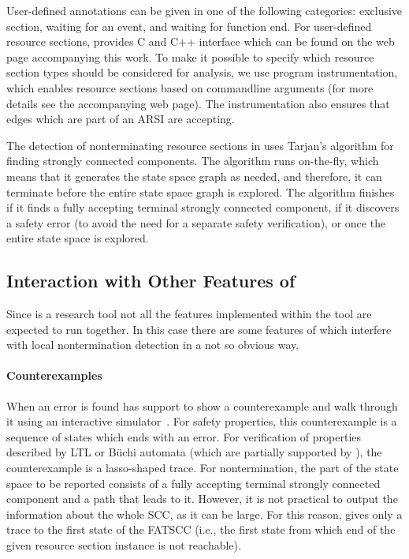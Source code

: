User-defined annotations can be given in one of the following categories: exclusive section,
 waiting for an event, and
 waiting for function end.
For user-defined resource sections, \divine provides C and C++ interface which can be found on the web page accompanying this work.
To make it possible to specify which resource section types should be considered
for analysis, we use program instrumentation, which enables resource sections
based on commandline arguments (for more details see the accompanying web page).
The instrumentation also ensures that edges which are part of an ARSI are accepting.

The detection of nonterminating resource sections in \divine uses Tarjan's algorithm for finding strongly connected components.
The algorithm runs on-the-fly, which means that it generates the state space
graph as needed, and therefore, it can terminate before the entire state space graph is explored.
The algorithm finishes if it finds a fully accepting terminal strongly connected
component, if it discovers a safety error (to avoid the need for a separate
safety verification), or once the entire state space is explored.


\subsection{Interaction with Other Features of \divine}

Since \divine is a research tool not all the features implemented within the
tool are expected to run together. In this case there are some
features of \divine which interfere with local nontermination detection
in a not so obvious way.


\paragraph{Counterexamples}
%
When an error is found \divine has support to show a counterexample and walk through it using an interactive simulator~.
For safety properties, this counterexample is a sequence of states which ends with an error.
For verification of properties described by LTL or Büchi automata (which are partially supported by \divine), the counterexample is a lasso-shaped trace.
For nontermination, the  part of the state space to be reported consists of a fully
accepting terminal strongly connected component and a path that leads to it.
However, it is not practical to output the information about the whole SCC, as it can be large.
For this reason, \divine gives only a trace to the first state of the FATSCC (i.e., the first state from which end of the given resource section instance is not reachable).

